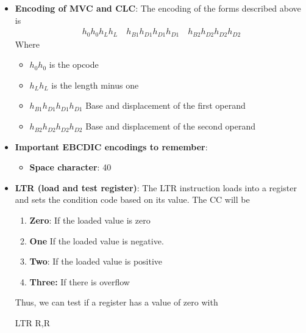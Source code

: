 \documentclass{report}
\begin{document}
\begin{itemize}
\begin{itemize}
\begin{cppcode}
                            \end{cppcode}
                    \end{itemize}
                \item \textbf{Encoding of MVC and CLC}: The encoding of the forms described above is 
                    \bigbreak \noindent 
                    \begin{align*}
                        h_{0}h_{0}h_{L}h_{L} \quad h_{B1}h_{D1}h_{D1}h_{D1} \quad h_{B2}h_{D2}h_{D2}h_{D2}
                    \end{align*}
                    Where
                    \begin{itemize}
                        \item $h_{0}h_{0}$ is the opcode
                        \item $h_{L}h_{L}$ is the length minus one 
                        \item $h_{B1}h_{D1}h_{D1}h_{D1}$ Base and displacement of the first operand
                        \item $h_{B2}h_{D2}h_{D2}h_{D2}$ Base and displacement of the second operand
                    \end{itemize}
            \item \textbf{Important EBCDIC encodings to remember}:
                \begin{itemize}
                    \item \textbf{Space character}: 40
                \end{itemize}
            \item \textbf{LTR (load and test register)}: The LTR instruction loads into a register and sets the condition code based on its value. The CC will be 
                \begin{enumerate}
                    \item \textbf{Zero}: If the loaded value is zero
                    \item \textbf{One} If the loaded value is negative.
                    \item \textbf{Two}: If the loaded value is positive
                    \item \textbf{Three:} If there is overflow
                \end{enumerate}
                Thus, we can test if a register has a value of zero with
                \bigbreak \noindent 
                \begin{cppcode}
                LTR R,R
                \end{cppcode}

\end{itemize}
\end{document}
